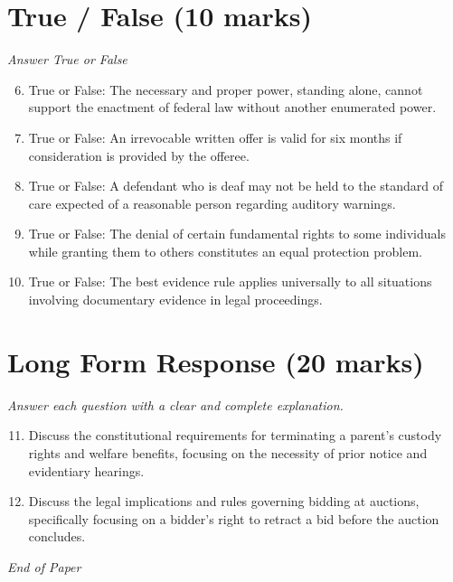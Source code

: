 \documentclass[12pt]{article}
\begin{document}
\section*{True / False (10 marks)}
\textit{Answer True or False}
\begin{enumerate}[label=\arabic*.]
\setcounter{enumi}{5}
\item True or False: The necessary and proper power, standing alone, cannot support the enactment of federal law without another enumerated power.
\item True or False: An irrevocable written offer is valid for six months if consideration is provided by the offeree.
\item True or False: A defendant who is deaf may not be held to the standard of care expected of a reasonable person regarding auditory warnings.
\item True or False: The denial of certain fundamental rights to some individuals while granting them to others constitutes an equal protection problem.
\item True or False: The best evidence rule applies universally to all situations involving documentary evidence in legal proceedings.
\end{enumerate}

\section*{Long Form Response (20 marks)}
\textit{Answer each question with a clear and complete explanation.}
\begin{enumerate}[label=\arabic*.]
\setcounter{enumi}{10}
\item Discuss the constitutional requirements for terminating a parent's custody rights and welfare benefits, focusing on the necessity of prior notice and evidentiary hearings.
\item Discuss the legal implications and rules governing bidding at auctions, specifically focusing on a bidder's right to retract a bid before the auction concludes.
\end{enumerate}

\vfill
\noindent\textit{End of Paper}
\end{document}
